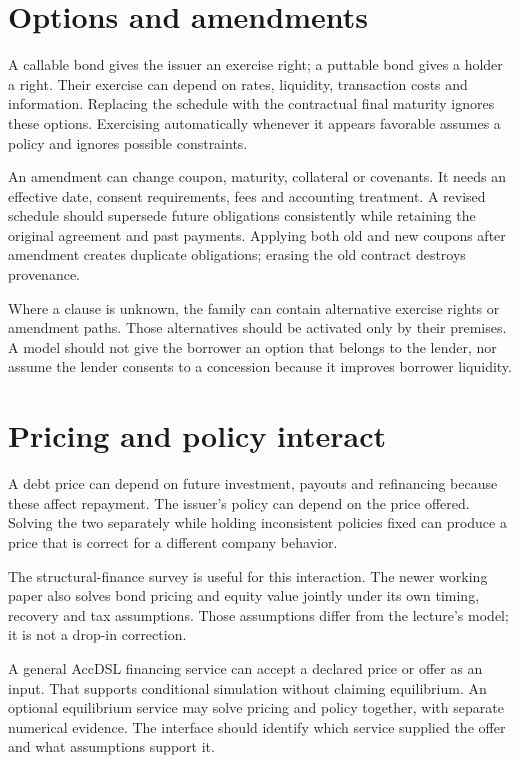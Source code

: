 \section{Options and amendments}
A callable bond gives the issuer an exercise right; a puttable bond gives a holder a right. Their exercise can depend on rates, liquidity, transaction costs and information. Replacing the schedule with the contractual final maturity ignores these options. Exercising automatically whenever it appears favorable assumes a policy and ignores possible constraints.

An amendment can change coupon, maturity, collateral or covenants. It needs an effective date, consent requirements, fees and accounting treatment. A revised schedule should supersede future obligations consistently while retaining the original agreement and past payments. Applying both old and new coupons after amendment creates duplicate obligations; erasing the old contract destroys provenance.

Where a clause is unknown, the family can contain alternative exercise rights or amendment paths. Those alternatives should be activated only by their premises. A model should not give the borrower an option that belongs to the lender, nor assume the lender consents to a concession because it improves borrower liquidity.

\section{Pricing and policy interact}
A debt price can depend on future investment, payouts and refinancing because these affect repayment. The issuer's policy can depend on the price offered. Solving the two separately while holding inconsistent policies fixed can produce a price that is correct for a different company behavior.

The structural-finance survey \citet[Sections 3.4--3.6]{strebulaev2012} is useful for this interaction. The newer working paper \citet[Sections 2.1.3--2.1.5 and 3]{duarte2026} also solves bond pricing and equity value jointly under its own timing, recovery and tax assumptions. Those assumptions differ from the lecture's model; it is not a drop-in correction.

A general AccDSL financing service can accept a declared price or offer as an input. That supports conditional simulation without claiming equilibrium. An optional equilibrium service may solve pricing and policy together, with separate numerical evidence. The interface should identify which service supplied the offer and what assumptions support it.


